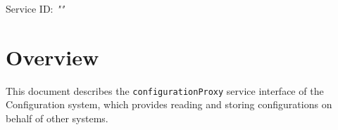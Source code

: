 \documentclass[a4paper]{arrowhead}
\begin{document}
\sloppy

\ArrowheadSetup

\begin{center}
  \vspace*{1cm}
  \huge{\arrowtitle}

  \vspace*{0.2cm}
  \LARGE{\arrowtype}
  \vspace*{1cm}

  \Large{Service ID: \textit{"\arrowid"}}

  \vspace*{\fill}


  \vspace*{1cm}
  \vspace*{\fill}

  \begin{abstract}
    This document describes the HTTP/1.1 protocol with TLS payload security and JSON payload encoding variant of the \texttt{configurationProxy} service of the Configuration system.
  \end{abstract}

  \vspace*{1cm}
\end{center}

\newpage

\tableofcontents
\newpage

\section{Overview}
\label{sec:overview}

This document describes the \texttt{configurationProxy} service interface of the Configuration system, which provides reading and storing configurations on behalf of other systems.
\end{document}
